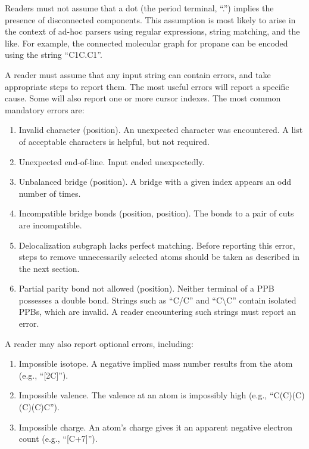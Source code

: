 \documentclass{article}
\begin{document}
Readers must not assume that a dot (the period terminal, \enquote{.}) implies the presence of disconnected components. This assumption is most likely to arise in the context of ad-hoc parsers using regular expressions, string matching, and the like. For example, the connected molecular graph for propane can be encoded using the string \enquote{C1C.C1}.

A reader must assume that any input string can contain errors, and take appropriate steps to report them. The most useful errors will report a specific cause. Some will also report one or more cursor indexes. The most common mandatory errors are:

\begin{enumerate}
    \item{Invalid character (position). An unexpected character was encountered. A list of acceptable characters is helpful, but not required.}
    \item{Unexpected end-of-line. Input ended unexpectedly.}
    \item{Unbalanced bridge (position). A bridge with a given index appears an odd number of times.}
    \item{Incompatible bridge bonds (position, position). The bonds to a pair of cuts are incompatible.}
    \item{Delocalization subgraph lacks perfect matching. Before reporting this error, steps to remove unnecessarily selected atoms should be taken as described in the next section.}
    \item{Partial parity bond not allowed (position). Neither terminal of a PPB possesses a double bond. Strings such as \enquote{C/C} and \enquote{C{\textbackslash}C} contain isolated PPBs, which are invalid. A reader encountering such strings must report an error.}
\end{enumerate}

A reader may also report optional errors, including:

\begin{enumerate}
    \item{Impossible isotope. A negative implied mass number results from the atom (e.g., \enquote{[2C]}).}
    \item{Impossible valence. The valence at an atom is impossibly high (e.g., \enquote{C(C)(C)(C)(C)C}).}
    \item{Impossible charge. An atom's charge gives it an apparent negative electron count (e.g., \enquote{[C+7]}).}
\end{enumerate}
\end{document}
